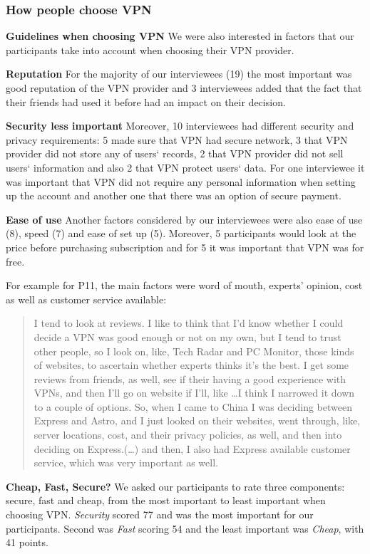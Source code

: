 \subsubsection{How people choose VPN} 
\label{sec:findings-choosing}
\textbf{Guidelines when choosing VPN}
We were also interested in factors that our participants take into account when choosing their VPN provider. 

\textbf{Reputation} For the majority of our interviewees (19) the most important was good reputation of the VPN provider and 3 interviewees added that the fact that their friends had used it before had an impact on their decision. 

\textbf{Security less important} Moreover, 10 interviewees had different security and privacy requirements: 5 made sure that VPN had secure network, 3 that VPN provider did not store any of users‘ records, 2 that VPN provider did not sell users‘ information and also 2 that VPN protect users‘ data. For one interviewee it was important that VPN did not require any personal information when setting up the account and another one that there was an option of secure payment. 

\textbf{Ease of use} Another factors considered by our interviewees were also ease of use (8), speed (7) and ease of set up (5). Moreover, 5 participants would look at the price before purchasing subscription and for 5 it was important that VPN was for free.   

For example for P11, the main factors were word of mouth, experts’ opinion, cost as well as customer service available:
\begin{quote}I tend to look at reviews. I like to think that I'd know whether I could decide a VPN was good enough or not on my own, but I tend to trust other people, so I look on, like, Tech Radar and PC Monitor, those kinds of websites, to ascertain whether experts thinks it's the best. I get some reviews from friends, as well, see if their having a good experience with VPNs, and then I'll go on website if I'll, like \dots I think I narrowed it down to a couple of options. So, when I came to China I was deciding between Express and Astro, and I just looked on their websites, went through, like, server locations, cost, and their privacy policies, as well, and then into deciding on Express.(\dots)
and then, I also had Express available customer service, which was very important as well.\end{quote}

\textbf{Cheap, Fast, Secure?} We asked our participants to rate three components: secure, fast and cheap, from the most important to least important when choosing VPN. \textit{Security} scored 77 and was the most important for our participants. Second was \textit{Fast} scoring 54 and the least important was \textit{Cheap}, with 41 points.


